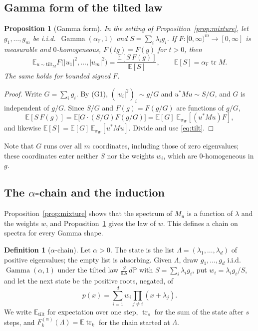 \documentclass[11pt,a4paper]{article}
\newtheorem{proposition}[theorem]{Proposition}
\theoremstyle{definition}
\newtheorem{definition}[theorem]{Definition}
\newcommand{\E}{\mathbb{E}}
\newcommand{\PP}{\mathbb{P}}
\newcommand{\F}{\mathbb{F}}
\newcommand{\tr}{\operatorname{tr}}
\newcommand{\Gam}{\operatorname{Gamma}}
\newcommand{\tilt}{\mathrm{tilt}}
\begin{document}
\subsection{Gamma form of the tilted law}
\begin{proposition}[Gamma form]\label{prop:gamma}
In the setting of Proposition~\ref{prop:mixture}, let $g_1,\dots,g_m$ be i.i.d.\ $\Gam(\alpha_\F,1)$ and $S=\sum_i\lambda_ig_i$. If $F:[0,\infty)^m\to[0,\infty]$ is measurable and $0$-homogeneous, $F(tg)=F(g)$ for $t>0$, then
\[
\E_{u\sim\tilt_M}F\big(|u_1|^2,\dots,|u_m|^2\big)=\frac{\E[S\,F(g)]}{\E[S]},\qquad \E[S]=\alpha_\F\tr M.
\]
The same holds for bounded signed $F$.
\end{proposition}

\begin{proof}
Write $G=\sum_ig_i$. By (G1), $(|u_i|^2)_i\sim g/G$ and $u^*Mu\sim S/G$, and $G$ is independent of $g/G$. Since $S/G$ and $F(g)=F(g/G)$ are functions of $g/G$,
\[
\E[S\,F(g)]=\E\big[G\cdot(S/G)F(g/G)\big]=\E[G]\;\E_{\sigma_W}[(u^*Mu)F],
\]
and likewise $\E[S]=\E[G]\,\E_{\sigma_W}[u^*Mu]$. Divide and use \eqref{eq:tilt}.
\end{proof}

Note that $G$ runs over all $m$ coordinates, including those of zero eigenvalues; these coordinates enter neither $S$ nor the weights $w_i$, which are $0$-homogeneous in $g$.

\subsection{The $\alpha$-chain and the induction}
Proposition~\ref{prop:mixture} shows that the spectrum of $M_u$ is a function of $\lambda$ and the weights $w$, and Proposition~\ref{prop:gamma} gives the law of $w$. This defines a chain on spectra for every Gamma shape.

\begin{definition}[$\alpha$-chain]\label{def:alphachain}
Let $\alpha>0$. The state is the list $\Lambda=(\lambda_1,\dots,\lambda_d)$ of positive eigenvalues; the empty list is absorbing. Given $\Lambda$, draw $g_1,\dots,g_d$ i.i.d.\ $\Gam(\alpha,1)$ under the tilted law $\frac{S}{\E S}\,d\PP$ with $S=\sum_i\lambda_ig_i$, put $w_i=\lambda_ig_i/S$, and let the next state be the positive roots, negated, of
\[
p(x)=\sum_{i=1}^dw_i\prod_{j\ne i}(x+\lambda_j).
\]
We write $\E_\tilt$ for expectation over one step, $\tr_s$ for the sum of the state after $s$ steps, and $F^{(\alpha)}_k(\Lambda)=\E\tr_k$ for the chain started at $\Lambda$.
\end{definition}
\end{document}
